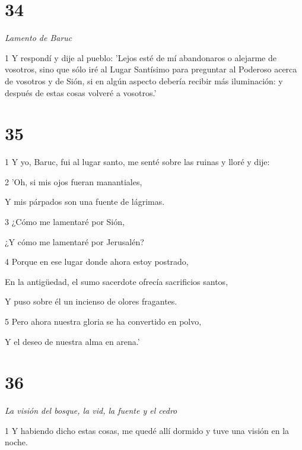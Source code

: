 \chapter{34}

\par \textit{Lamento de Baruc}

\par 1 Y respondí y dije al pueblo: 'Lejos esté de mí abandonaros o alejarme de vosotros, sino que sólo iré al Lugar Santísimo para preguntar al Poderoso acerca de vosotros y de Sión, si en algún aspecto debería recibir más iluminación: y después de estas cosas volveré a vosotros.'

\chapter{35}

\par 1 Y yo, Baruc, fui al lugar santo, me senté sobre las ruinas y lloré y dije:

\par 2 'Oh, si mis ojos fueran manantiales,

Y mis párpados son una fuente de lágrimas.

\par 3 ¿Cómo me lamentaré por Sión,

\par ¿Y cómo me lamentaré por Jerusalén?

\par 4 Porque en ese lugar donde ahora estoy postrado,

En la antigüedad, el sumo sacerdote ofrecía sacrificios santos,

\par Y puso sobre él un incienso de olores fragantes.

\par 5 Pero ahora nuestra gloria se ha convertido en polvo,

\par Y el deseo de nuestra alma en arena.'

\chapter{36}

\par \textit{La visión del bosque, la vid, la fuente y el cedro}

\par 1 Y habiendo dicho estas cosas, me quedé allí dormido y tuve una visión en la noche.

